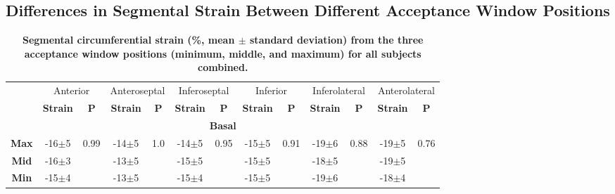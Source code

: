 \begin{appendices}
	\appendixtitletocoff
	\appendix
	
\chapter{Differences in Segmental Strain Between Different Acceptance Window Positions}
	
	\begin{table}
		\centering
		\caption[Segmental circumferential strain (\%, mean $\pm$ standard deviation) from the three acceptance window positions (minimum, middle, and maximum) for all subjects combined]{\textbf{Segmental circumferential strain (\%, mean $\pm$ standard deviation) from the three acceptance window positions (minimum, middle, and maximum) for all subjects combined.}}
		\label{table:SegmentialEccStrainDiff}
		\begin{tabular}{ccccccccccccc}
			\toprule
			\multirow{2}{*}{} & \multicolumn{2}{c}{Anterior} & \multicolumn{2}{c}{Anteroseptal} & \multicolumn{2}{c}{Inferoseptal} &
			\multicolumn{2}{c}{Inferior} & \multicolumn{2}{c}{Inferolateral} & \multicolumn{2}{c}{Anterolateral}\\
			 & \textbf{Strain} & \textbf{P} & \textbf{Strain} & \textbf{P} & \textbf{Strain} & \textbf{P} &
			   \textbf{Strain} & \textbf{P} & \textbf{Strain} & \textbf{P} & \textbf{Strain} & \textbf{P} \\
			\midrule
			
			\multicolumn{13}{c}{\textbf{Basal}} \\
			\midrule
			\textbf{Max} & -16$\pm$5 & \multirow{3}{*}{0.99} & -14$\pm$5 & \multirow{3}{*}{1.0} & -14$\pm$5 & \multirow{3}{*}{0.95}
			             & -15$\pm$5 & \multirow{3}{*}{0.91} & -19$\pm$6 & \multirow{3}{*}{0.88} & -19$\pm$5 & \multirow{3}{*}{0.76} \\
			\textbf{Mid} & -16$\pm$3 &                       & -13$\pm$5 &                       & -15$\pm$5 & 
						 & -15$\pm$5 &                       & -18$\pm$5 &                       & -19$\pm$5 &                       \\
			\textbf{Min} & -15$\pm$4 &                       & -13$\pm$5 &                       & -15$\pm$4 & 
						 & -15$\pm$5 &                       & -19$\pm$6 &                       & -18$\pm$4 &  \\ 
			\midrule
			

\end{tabular}
\end{table}
\end{appendices}
